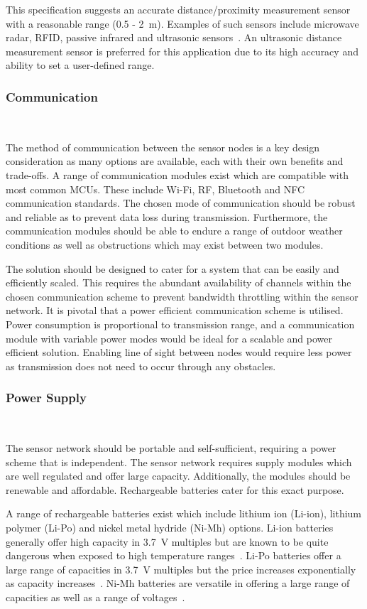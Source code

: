 \documentclass[10pt,twocolumn]{witseiepaper}
\begin{document}
			This specification suggests an accurate distance/proximity measurement sensor with a reasonable range (0.5 - 2~m). Examples of such sensors include microwave radar, RFID, passive infrared and ultrasonic sensors~\cite{parkingSystem}. An ultrasonic distance measurement sensor is preferred for this application due to its high accuracy and ability to set a user-defined range.
			
		\subsubsection{Communication} $   $

			The method of communication between the sensor nodes is a key design consideration as many options are available, each with their own benefits and trade-offs. A range of communication modules exist which are compatible with most common MCUs. These include Wi-Fi, RF, Bluetooth and NFC communication standards. The chosen mode of communication should be robust and reliable as to prevent data loss during transmission. Furthermore, the communication modules should be able to endure a range of outdoor weather conditions as well as obstructions which may exist between two modules.

			The solution should be designed to cater for a system that can be easily and efficiently scaled. This requires the abundant availability of channels within the chosen communication scheme to prevent bandwidth throttling within the sensor network. It is pivotal that a power efficient communication scheme is utilised. Power consumption is proportional to transmission range, and a communication module with variable power modes would be ideal for a scalable and power efficient solution. Enabling line of sight between nodes would require less power as transmission does not need to occur through any obstacles.
			
		\subsubsection{Power Supply} $   $
			
			The sensor network should be portable and self-sufficient, requiring a power scheme that is independent. The sensor network requires supply modules which are well regulated and offer large capacity. Additionally, the modules should be renewable and affordable. Rechargeable batteries cater for this exact purpose.

			A range of rechargeable batteries exist which include lithium ion (Li-ion), lithium polymer (Li-Po) and nickel metal hydride (Ni-Mh) options. Li-ion batteries generally offer high capacity in 3.7~V multiples but are known to be quite dangerous when exposed to high temperature ranges~\cite{li-ion}. Li-Po batteries offer a large range of capacities in 3.7~V multiples but the price increases exponentially as capacity increases~\cite{li-po}. Ni-Mh batteries are versatile in offering a large range of capacities as well as a range of voltages~\cite{ni-mh}.
\end{document}
